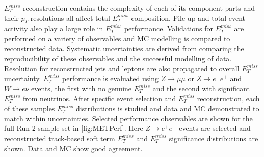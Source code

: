 $E_T^{miss}$ reconstruction contains the complexity of each of its component parts and their $p_T$ resolutions all affect total $E_T^{miss}$ composition. Pile-up and total event activity also play a large role in $E_T^{miss}$ performance. Validations for $E_T^{miss}$ are performed on a variety of observables and MC modelling is compared to reconstructed data. Systematic uncertainties are derived from comparing the reproducibility of these observables and the successful modelling of data. Resolution for reconstructed jets and leptons are also propagated to overall $E_T^{miss}$ uncertainty. $E_T^{miss}$ performance is evaluated using $Z\rightarrow \mu\mu$ or $Z\rightarrow e^-e^+$ and $W\rightarrow e\nu$ events, the first with no genuine $E_T^{miss}$ and the second with significant $E_T^{miss}$ from neutrinos. After specific event selection and $E_T^{miss}$ reconstruction, each of these samples $E_T^{miss}$ distributions is studied and data and MC demonstrated to match within uncertainties. Selected performance observables are shown for the full Run-2 sample set in \ref{fig:METPerf}. Here $Z\rightarrow e^+e^-$ events are selected and reconstructed track-based soft term $E_T^{miss}$ and $E_T^{miss}$ significance distributions are shown. Data and MC show good agreement.

